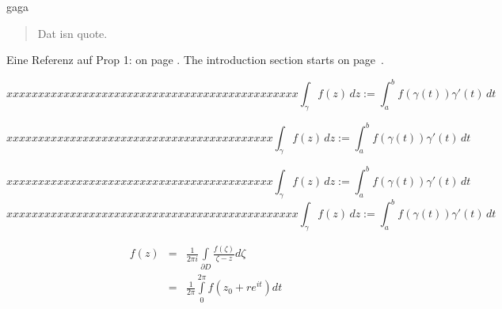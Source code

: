 \documentclass[twoside,11pt]{article}
\theoremstyle{lines}
\theoremstyle{longplain}
\begin{document}
\begin{Proposition}\label{FirstProp}
gaga
  \begin{quote}
    Dat isn quote.
  \end{quote}
\end{Proposition}

Eine Referenz auf Prop 1:  on page
\pageref{FirstProp}.
The introduction section starts on page~\pageref{sec:introduction}.

\begin{Lemma}
\begin{equation}
 xxxxxxxxxxxxxxxxxxxxxxxxxxxxxxxxxxxxxxxxxxxxxx
 \int_{\gamma} f(z)\, dz := \int_a^b f(\gamma (t)) \gamma'(t) \, dt
\end{equation}

\begin{equation}
 xxxxxxxxxxxxxxxxxxxxxxxxxxxxxxxxxxxxxxxxxx
 \int_{\gamma} f(z)\, dz := \int_a^b f(\gamma (t)) \gamma'(t) \, dt
\end{equation}%
\end{Lemma}
\begin{Lemma*}
\def\LemmaSymbol{\ProofSymbol}
\begin{equation}
 xxxxxxxxxxxxxxxxxxxxxxxxxxxxxxxxxxxxxxxxxx
 \int_{\gamma} f(z)\, dz := \int_a^b f(\gamma (t)) \gamma'(t) \, dt
\end{equation}
\begin{equation}
 xxxxxxxxxxxxxxxxxxxxxxxxxxxxxxxxxxxxxxxxxxxxxx
 \int_{\gamma} f(z)\, dz := \int_a^b f(\gamma (t)) \gamma'(t) \, dt
\end{equation}
\end{Lemma*}
\begin{Definition}
\begin{eqnarray}
f(z) &=&
   \frac{1}{2\pi i}
   \int \limits_{\partial D} \frac{f(\zeta)}{\zeta-z} d\zeta \\
&= &
   \frac{1}{2\pi}
   \int \limits_0^{2\pi}
      f(z_0 + re^{it}) dt
\end{eqnarray}
\end{Definition}
\end{document}
